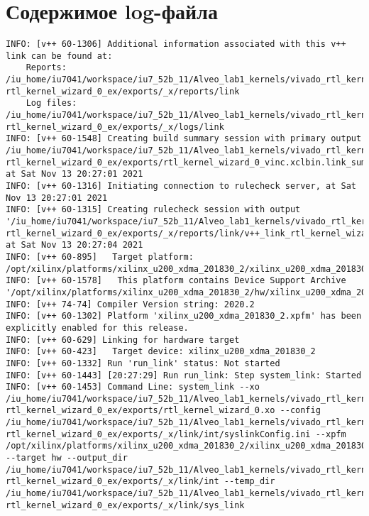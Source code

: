 \chapter{Содержимое log-файла}
\label{cha:appendix1}


\begin{lstlisting}[label=code:log_file, caption=Содержимое log-файла, basicstyle=\tiny]
INFO: [v++ 60-1306] Additional information associated with this v++ link can be found at:
	Reports: /iu_home/iu7041/workspace/iu7_52b_11/Alveo_lab1_kernels/vivado_rtl_kernel/ rtl_kernel_wizard_0_ex/exports/_x/reports/link
	Log files: /iu_home/iu7041/workspace/iu7_52b_11/Alveo_lab1_kernels/vivado_rtl_kernel/ rtl_kernel_wizard_0_ex/exports/_x/logs/link
INFO: [v++ 60-1548] Creating build summary session with primary output /iu_home/iu7041/workspace/iu7_52b_11/Alveo_lab1_kernels/vivado_rtl_kernel/ rtl_kernel_wizard_0_ex/exports/rtl_kernel_wizard_0_vinc.xclbin.link_summary, at Sat Nov 13 20:27:01 2021
INFO: [v++ 60-1316] Initiating connection to rulecheck server, at Sat Nov 13 20:27:01 2021
INFO: [v++ 60-1315] Creating rulecheck session with output '/iu_home/iu7041/workspace/iu7_52b_11/Alveo_lab1_kernels/vivado_rtl_kernel/ rtl_kernel_wizard_0_ex/exports/_x/reports/link/v++_link_rtl_kernel_wizard_0_vinc_guidance.html', at Sat Nov 13 20:27:04 2021
INFO: [v++ 60-895]   Target platform: /opt/xilinx/platforms/xilinx_u200_xdma_201830_2/xilinx_u200_xdma_201830_2.xpfm
INFO: [v++ 60-1578]   This platform contains Device Support Archive '/opt/xilinx/platforms/xilinx_u200_xdma_201830_2/hw/xilinx_u200_xdma_201830_2.dsa'
INFO: [v++ 74-74] Compiler Version string: 2020.2
INFO: [v++ 60-1302] Platform 'xilinx_u200_xdma_201830_2.xpfm' has been explicitly enabled for this release.
INFO: [v++ 60-629] Linking for hardware target
INFO: [v++ 60-423]   Target device: xilinx_u200_xdma_201830_2
INFO: [v++ 60-1332] Run 'run_link' status: Not started
INFO: [v++ 60-1443] [20:27:29] Run run_link: Step system_link: Started
INFO: [v++ 60-1453] Command Line: system_link --xo /iu_home/iu7041/workspace/iu7_52b_11/Alveo_lab1_kernels/vivado_rtl_kernel/  rtl_kernel_wizard_0_ex/exports/rtl_kernel_wizard_0.xo --config /iu_home/iu7041/workspace/iu7_52b_11/Alveo_lab1_kernels/vivado_rtl_kernel/  rtl_kernel_wizard_0_ex/exports/_x/link/int/syslinkConfig.ini --xpfm /opt/xilinx/platforms/xilinx_u200_xdma_201830_2/xilinx_u200_xdma_201830_2.xpfm --target hw --output_dir /iu_home/iu7041/workspace/iu7_52b_11/Alveo_lab1_kernels/vivado_rtl_kernel/  rtl_kernel_wizard_0_ex/exports/_x/link/int --temp_dir /iu_home/iu7041/workspace/iu7_52b_11/Alveo_lab1_kernels/vivado_rtl_kernel/  rtl_kernel_wizard_0_ex/exports/_x/link/sys_link

\end{lstlisting}
